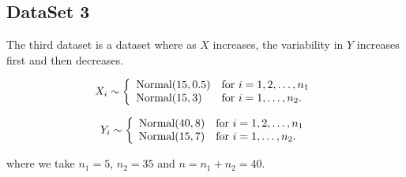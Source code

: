         
        


\subsection{DataSet 3}


The third dataset is a dataset where as $X$ increases, the variability in $Y$ increases first and then decreases.

\[ X_i \sim \left\{ \begin{array}{ll}
         \hbox{Normal} (15, 0.5) & \mbox{for $i = 1,2, \dots, n_1$}\\
        \hbox{Normal} (15, 3) & \mbox{for $i = 1,  \dots, n_2$}.\end{array} \right. \]

\[ Y_i \sim \left\{ \begin{array}{ll}
         \hbox{Normal} (40 , 8) & \mbox{for $i = 1,2, \dots, n_1$}\\
        \hbox{Normal}  (15 , 7) & \mbox{for $i = 1, \dots, n_2$}.\end{array} \right. \]
        
 where we take $n_1 = 5$, $n_2 = 35$ and $n = n_1 + n_2 = 40$. \\       
 
